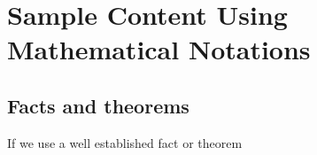 \documentclass[msc,oneside]{ubcthesis}%
\begin{document}









\chapter{Sample Content Using Mathematical Notations}

\section{Facts and theorems}
If we use a well established fact or theorem\ 
\end{document}
